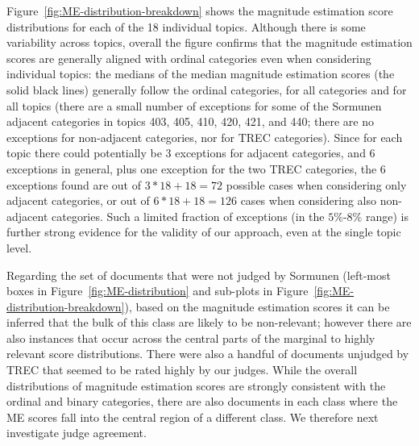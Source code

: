 Figure~\ref{fig:ME-distribution-breakdown} shows the magnitude
estimation score distributions for each of the 18 individual topics.
Although there is some variability across topics, overall the figure
confirms that the magnitude estimation scores are generally aligned
with ordinal categories even when considering individual topics: the
medians of the median magnitude estimation scores (the solid black
lines) generally follow the ordinal categories, for all categories and
for all topics (there are a small number of exceptions for some of the
Sormunen adjacent categories in topics 403, 405, 410, 420, 421, and
440; there are no exceptions for non-adjacent categories, nor for TREC
categories).
Since for each topic there could potentially be 3 exceptions for
adjacent categories, and 6 exceptions in general, plus one exception
for the two TREC categories, the 6 exceptions found are out of $3 * 18
+ 18 = 72$ possible cases when considering only adjacent categories, or
out of $6 * 18 + 18 = 126$ cases when considering also non-adjacent
categories.
Such a limited fraction of exceptions (in the $5\%$-$8\%$ range) is
further strong evidence for the validity of our approach, even at the
single topic level.

Regarding the set of documents that were not judged by Sormunen
(left-most boxes in Figure~\ref{fig:ME-distribution} and sub-plots in
Figure~\ref{fig:ME-distribution-breakdown}), based on the magnitude
estimation scores it can be inferred that the bulk of this class are
likely to be non-relevant; however there are also instances that occur
across the central parts of the marginal to highly relevant score
distributions. There were also a handful of documents unjudged by 
TREC that seemed to be rated highly by our judges.
While the overall distributions of
magnitude estimation scores are strongly consistent with the ordinal
and binary categories, there are also documents in each class 
where the ME scores 
fall into the central region of a different class.
We therefore next investigate judge agreement.




